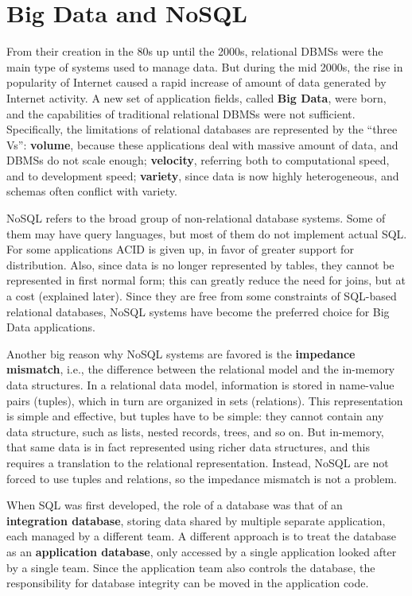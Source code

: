 \chapter{Big Data and NoSQL}

From their creation in the 80s up until the 2000s, relational DBMSs were the main type of systems used to manage data. But during the mid 2000s, the rise in popularity of Internet caused a rapid increase of amount of data generated by Internet activity. A new set of application fields, called \textbf{Big Data}, were born, and the capabilities of traditional relational DBMSs were not sufficient. Specifically, the limitations of relational databases are represented by the ``three Vs'': \textbf{volume}, because these applications deal with massive amount of data, and DBMSs do not scale enough; \textbf{velocity}, referring both to computational speed, and to development speed; \textbf{variety}, since data is now highly heterogeneous, and schemas often conflict with variety.

NoSQL refers to the broad group of non-relational database systems. Some of them may have query languages, but most of them do not implement actual SQL. For some applications ACID is given up, in favor of greater support for distribution. Also, since data is no longer represented by tables, they cannot be represented in first normal form; this can greatly reduce the need for joins, but at a cost (explained later). Since they are free from some constraints of SQL-based relational databases, NoSQL systems have become the preferred choice for Big Data applications.

Another big reason why NoSQL systems are favored is the \textbf{impedance mismatch}, i.e., the difference between the relational model and the in-memory data structures. In a relational data model, information is stored in name-value pairs (tuples), which in turn are organized in sets (relations). This representation is simple and effective, but tuples have to be simple: they cannot contain any data structure, such as lists, nested records, trees, and so on. But in-memory, that same data is in fact represented using richer data structures, and this requires a translation to the relational representation. Instead, NoSQL are not forced to use tuples and relations, so the impedance mismatch is not a problem.

When SQL was first developed, the role of a database was that of an \textbf{integration database}, storing data shared by multiple separate application, each managed by a different team. A different approach is to treat the database as an \textbf{application database}, only accessed by a single application looked after by a single team. Since the application team also controls the database, the responsibility for database integrity can be moved in the application code.

